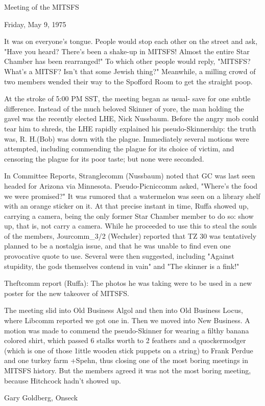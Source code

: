 \documentclass[12pt]{article}
\begin{document}
\begin{center}

Meeting of the MITSFS

Friday, May 9, 1975

\end{center}
 
\vspace{12pt}

\setlength{\parskip}{6pt}

\noindent
It was on everyone's tongue. People would stop each other on the street and ask, "Have you heard? There's been a shake-up in MITSFS! Almost the entire Star Chamber has been rearranged!" To which other people would reply, "MITSFS? What's a MITSF? Isn't that some Jewish thing?" Meanwhile, a milling crowd of two members wended their way to the Spofford Room to get the straight poop.

At the stroke of 5:00 PM SST, the meeting began as usual- save for one subtle difference. Instead of the much beloved Skinner of yore, the man holding the gavel was the recently elected LHE, Nick Nussbaum. Before the angry mob could tear him to shreds, the LHE rapidly explained his pseudo-Skinnership: the truth was, R. H.(Bob) was down with the plague. Immediately several motions were attempted, including commending the plague for its choice of victim, and censoring the plague for its poor taste; but none were seconded.

In Committee Reports, Stranglecomm (Nussbaum) noted that GC was last seen headed for Arizona via Minnesota. Pseudo-Picniccomm asked, "Where's the food we were promised?" It was rumored that a watermelon was seen on a library shelf with an orange sticker on it. At that precise instant in time, Ruffa showed up, carrying a camera, being the only former Star Chamber member to do so: show up, that is, not carry a camera. While he proceeded to use this to steal the souls of the members, Jourcomm_3/2 (Wechsler) reported that TZ 30 was tentatively planned to be a nostalgia issue, and that he was unable to find even one provocative quote to use. Several were then suggested, including "Against stupidity, the gods themselves contend in vain" and "The skinner is a fink!"

Theftcomm report (Ruffa): The photos he was taking were to be used in a new poster for the new takeover of MITSFS.

The meeting slid into Old Business Algol and then into Old Business Locus, where Libcomm reported we got one in. Then we moved into New Business. A motion was made to commend the pseudo-Skinner for wearing a filthy banana colored shirt, which passed 6 stalks worth to 2 feathers and a quockermodger (which is one of those 1ittle wooden stick puppets on a string) to Frank Perdue and one turkey farm +Spehn, thus closing one of the most boring meetings in MITSFS history. But the members agreed it was not the most boring meeting, because Hitchcock hadn't showed up.

\vspace{12pt}

\centerline{Gary Goldberg, Onseck}
\end{document}
